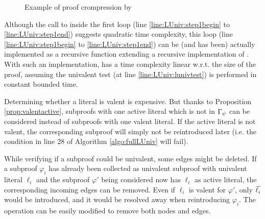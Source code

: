 \documentclass{easychair}
\begin{document}
\begin{figure}[htb]
  \centering
   \qquad
  \centering
\caption{Example of proof crompression by \LowerUnivalents} 
\label{fig:exluniv}
\end{figure}



Although the
call to  inside the first loop (line \ref{line:LUniv:step1begin} to
\ref{line:LUniv:step1end}) suggests quadratic time complexity, this loop (line
\ref{line:LUniv:step1begin} to \ref{line:LUniv:step1end}) can be (and has been) actually implemented
as a recursive function extending a recursive implementation of . With such an
implementation, {\LowerUnivalents} has a time complexity linear w.r.t. the size of the proof, assuming the
univalent test (at line \ref{line:LUniv:lunivtest}) is performed in constant bounded time. 


Determining whether a literal is valent is expensive. But thanks to Proposition \ref{prop:valentactive},
subproofs with one active literal which is not in $\Gamma_{\psi}$ can be considered instead
of subproofs with one valent literal.  If the active literal is not valent, the corresponding
subproof will simply not be reintroduced later (i.e. the condition in line 28 of Algorithm \ref{algo:fullLUniv} will fail).

While verifying if a subproof could be univalent, some edges might be deleted. If a
subproof $\varphi_i$ has already been collected as univalent subproof with univalent literal
$\ell_i$ and the subproof $\varphi'$ being considered now has $\ell_i$ as active literal, the
corresponding incoming edges can be removed. Even if $\ell_i$ is valent for $\varphi'$, only
$\overline{\ell_i}$ would be introduced, and it would be resolved away when reintroducing
$\varphi_i$. The  operation can be easily modified to remove both nodes and edges.
\end{document}
